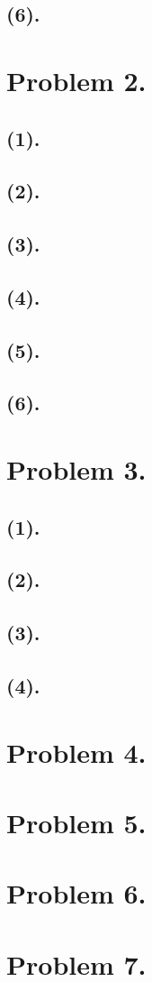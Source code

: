 \documentclass{article}
\begin{document}
\subsection{(6).}
\section{Problem 2.}
\subsection{(1).}
\subsection{(2).}
\subsection{(3).}
\subsection{(4).}
\subsection{(5).}
\subsection{(6).}
\section{Problem 3.}
\subsection{(1).}
\subsection{(2).}
\subsection{(3).}
\subsection{(4).}
\section{Problem 4.}
\section{Problem 5.}
\section{Problem 6.}
\section{Problem 7.}
\end{document}
